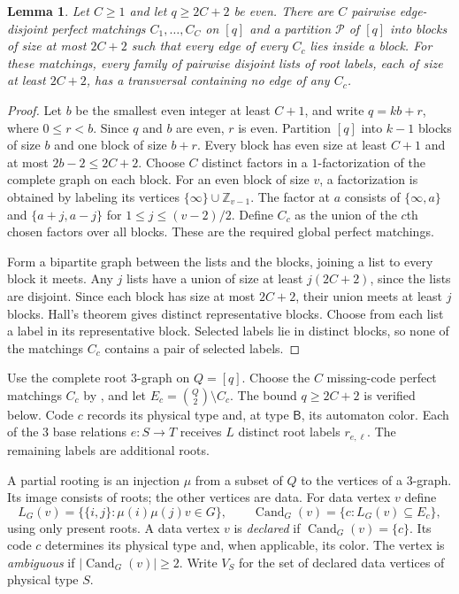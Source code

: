 \documentclass[10pt]{article}
\numberwithin{equation}{section}
\newtheorem{lemma}[lemma]{Lemma}\aliascntresetthe{lemma}
\theoremstyle{definition}
\newcommand{\Cand}{\operatorname{Cand}}
\begin{document}
\begin{lemma}\label{lem:block-codes}
Let $C\ge1$ and let $q\ge2C+2$ be even. There are $C$ pairwise edge-disjoint perfect matchings $C_1,\ldots,C_C$ on $[q]$ and a partition $\mathcal P$ of $[q]$ into blocks of size at most $2C+2$ such that every edge of every $C_c$ lies inside a block. For these matchings, every family of pairwise disjoint lists of root labels, each of size at least $2C+2$, has a transversal containing no edge of any $C_c$.
\end{lemma}
\begin{proof}
Let $b$ be the smallest even integer at least $C+1$, and write $q=kb+r$, where $0\le r<b$. Since $q$ and $b$ are even, $r$ is even. Partition $[q]$ into $k-1$ blocks of size $b$ and one block of size $b+r$. Every block has even size at least $C+1$ and at most $2b-2\le2C+2$. Choose $C$ distinct factors in a $1$-factorization of the complete graph on each block. For an even block of size $v$, a factorization is obtained by labeling its vertices $\{\infty\}\cup\mathbb Z_{v-1}$. The factor at $a$ consists of $\{\infty,a\}$ and $\{a+j,a-j\}$ for $1\le j\le(v-2)/2$. Define $C_c$ as the union of the $c$th chosen factors over all blocks. These are the required global perfect matchings.

Form a bipartite graph between the lists and the blocks, joining a list to every block it meets. Any $j$ lists have a union of size at least $j(2C+2)$, since the lists are disjoint. Since each block has size at most $2C+2$, their union meets at least $j$ blocks. Hall's theorem gives distinct representative blocks. Choose from each list a label in its representative block. Selected labels lie in distinct blocks, so none of the matchings $C_c$ contains a pair of selected labels.
\end{proof}

Use the complete root $3$-graph on $Q=[q]$. Choose the $C$ missing-code perfect matchings $C_c$ by , and let $E_c=\binom Q2\setminus C_c$. The bound $q\ge2C+2$ is verified below. Code $c$ records its physical type and, at type $\mathsf B$, its automaton color. Each of the 3 base relations $e\colon S\to T$ receives $L$ distinct root labels $r_{e,\ell}$. The remaining labels are additional roots.

A partial rooting is an injection $\mu$ from a subset of $Q$ to the vertices of a $3$-graph. Its image consists of roots; the other vertices are data. For data vertex $v$ define
\[
 L_G(v)=\{\{i,j\}\colon\mu(i)\mu(j)v\in G\},\qquad
 \Cand_G(v)=\{c\colon L_G(v)\subseteq E_c\},
\]
using only present roots. A data vertex $v$ is \emph{declared} if $\Cand_G(v)=\{c\}$. Its code $c$ determines its physical type and, when applicable, its color. The vertex is \emph{ambiguous} if $|\Cand_G(v)|\ge2$. Write $V_S$ for the set of declared data vertices of physical type $S$.
\end{document}
